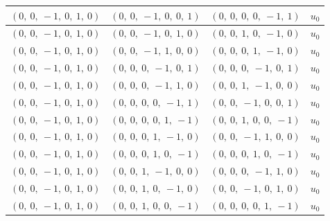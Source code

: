 \documentclass[11pt]{article}
\theoremstyle{definition}
\begin{document}
\begin{longtable}{|l|l|l|c|}
    \hline
    $\left( 0, \  0, \  -1, \  0, \  1, \  0\right)$ & $\left( 0, \  0, \  -1, \  0, \  0, \  1\right)$ & $\left( 0, \  0, \  0, \  0, \  -1, \  1\right)$ & $u_{0}$ \\
    \hline
    $\left( 0, \  0, \  -1, \  0, \  1, \  0\right)$ & $\left( 0, \  0, \  -1, \  0, \  1, \  0\right)$ & $\left( 0, \  0, \  1, \  0, \  -1, \  0\right)$ & $u_{0}$ \\
    \hline
    $\left( 0, \  0, \  -1, \  0, \  1, \  0\right)$ & $\left( 0, \  0, \  -1, \  1, \  0, \  0\right)$ & $\left( 0, \  0, \  0, \  1, \  -1, \  0\right)$ & $u_{0}$ \\
    \hline
    $\left( 0, \  0, \  -1, \  0, \  1, \  0\right)$ & $\left( 0, \  0, \  0, \  -1, \  0, \  1\right)$ & $\left( 0, \  0, \  0, \  -1, \  0, \  1\right)$ & $u_{0}$ \\
    \hline
    $\left( 0, \  0, \  -1, \  0, \  1, \  0\right)$ & $\left( 0, \  0, \  0, \  -1, \  1, \  0\right)$ & $\left( 0, \  0, \  1, \  -1, \  0, \  0\right)$ & $u_{0}$ \\
    \hline
    $\left( 0, \  0, \  -1, \  0, \  1, \  0\right)$ & $\left( 0, \  0, \  0, \  0, \  -1, \  1\right)$ & $\left( 0, \  0, \  -1, \  0, \  0, \  1\right)$ & $u_{0}$ \\
    \hline
    $\left( 0, \  0, \  -1, \  0, \  1, \  0\right)$ & $\left( 0, \  0, \  0, \  0, \  1, \  -1\right)$ & $\left( 0, \  0, \  1, \  0, \  0, \  -1\right)$ & $u_{0}$ \\
    \hline
    $\left( 0, \  0, \  -1, \  0, \  1, \  0\right)$ & $\left( 0, \  0, \  0, \  1, \  -1, \  0\right)$ & $\left( 0, \  0, \  -1, \  1, \  0, \  0\right)$ & $u_{0}$ \\
    \hline
    $\left( 0, \  0, \  -1, \  0, \  1, \  0\right)$ & $\left( 0, \  0, \  0, \  1, \  0, \  -1\right)$ & $\left( 0, \  0, \  0, \  1, \  0, \  -1\right)$ & $u_{0}$ \\
    \hline
    $\left( 0, \  0, \  -1, \  0, \  1, \  0\right)$ & $\left( 0, \  0, \  1, \  -1, \  0, \  0\right)$ & $\left( 0, \  0, \  0, \  -1, \  1, \  0\right)$ & $u_{0}$ \\
    \hline
    $\left( 0, \  0, \  -1, \  0, \  1, \  0\right)$ & $\left( 0, \  0, \  1, \  0, \  -1, \  0\right)$ & $\left( 0, \  0, \  -1, \  0, \  1, \  0\right)$ & $u_{0}$ \\
    \hline
    $\left( 0, \  0, \  -1, \  0, \  1, \  0\right)$ & $\left( 0, \  0, \  1, \  0, \  0, \  -1\right)$ & $\left( 0, \  0, \  0, \  0, \  1, \  -1\right)$ & $u_{0}$ \\

\end{longtable}
\end{document}
